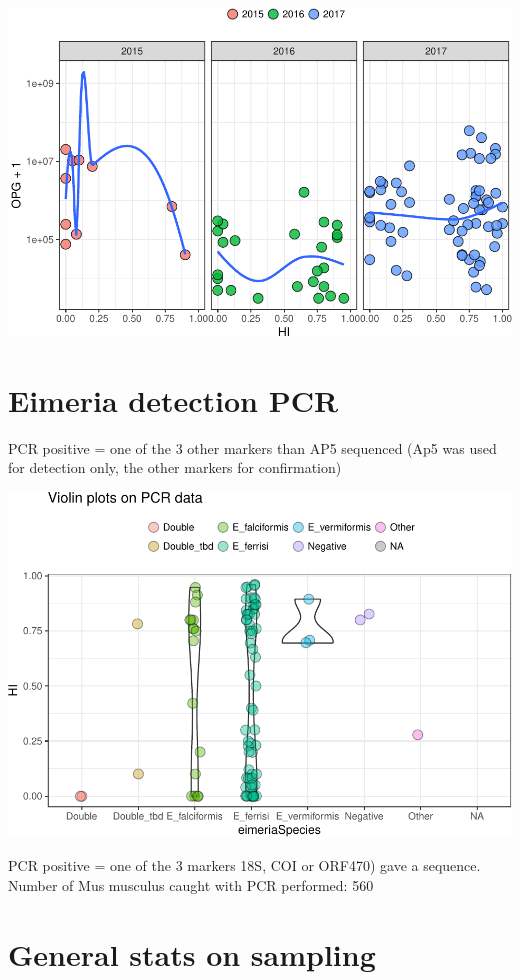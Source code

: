\documentclass[]{article}
\begin{document}
\includegraphics{Data_Analysis_Alice_files/figure-latex/oocystssmooth-1.pdf}

\section{Eimeria detection PCR}\label{eimeria-detection-pcr}

PCR positive = one of the 3 other markers than AP5 sequenced (Ap5 was
used for detection only, the other markers for confirmation)

\includegraphics{Data_Analysis_Alice_files/figure-latex/pcr-1.pdf}

PCR positive = one of the 3 markers 18S, COI or ORF470) gave a sequence.
Number of Mus musculus caught with PCR performed: 560

\section{General stats on sampling}\label{general-stats-on-sampling}
\end{document}
